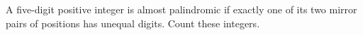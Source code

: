 A five-digit positive integer is almost palindromic if exactly one of its two mirror pairs of positions has unequal digits. Count these integers.

